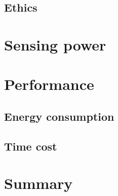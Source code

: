 \subsection{Ethics}

\section{Sensing power}
\section{Performance}
\subsection{Energy consumption}
\subsection{Time cost}
\section{Summary}